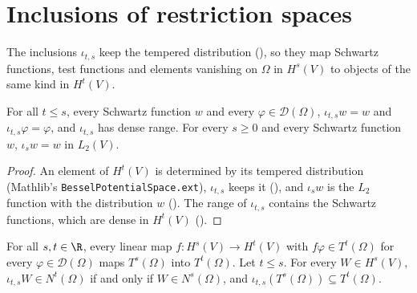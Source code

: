 \section{Inclusions of restriction spaces}
\label{sec:restriction-inclusions}

The inclusions $\iota_{t,s}$ keep the tempered distribution (), so
they map Schwartz functions, test functions and elements vanishing on $\Omega$ in $H^s(V)$ to
objects of the same kind in $H^t(V)$.

\begin{lemma}
\label{lem:sobolev-inclusion-tests}
\leanok
{}
For all $t \leq s$, every Schwartz function $w$ and every $\varphi \in \mathcal D(\Omega)$,
$\iota_{t,s} w = w$ and $\iota_{t,s} \varphi = \varphi$, and $\iota_{t,s}$ has dense range. For
every $s \geq 0$ and every Schwartz function $w$, $\iota_s w = w$ in $L_2(V)$.
\end{lemma}

\begin{proof}
\leanok
An element of $H^t(V)$ is determined by its tempered distribution (Mathlib's
\texttt{BesselPotentialSpace.\allowbreak ext}), $\iota_{t,s}$ keeps it
(), and $\iota_s w$ is the $L_2$ function with the distribution $w$
(). The range of $\iota_{t,s}$ contains the Schwartz functions, which
are dense in $H^t(V)$ ().
\end{proof}

\begin{lemma}
\label{lem:sobolev-inclusion-vanishing}
\leanok
{}
For all $s, t \in \R$, every linear map $f : H^s(V) \to H^t(V)$ with $f \varphi \in T^t(\Omega)$
for every $\varphi \in \mathcal D(\Omega)$ maps $T^s(\Omega)$ into $T^t(\Omega)$. Let $t \leq s$.
For every $W \in H^s(V)$, $\iota_{t,s} W \in N^t(\Omega)$ if and only if $W \in N^s(\Omega)$,
and $\iota_{t,s}(T^s(\Omega)) \subseteq T^t(\Omega)$.
\end{lemma}

